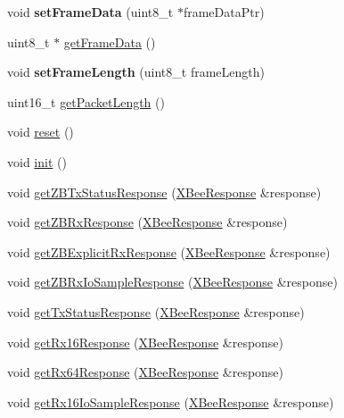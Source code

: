 \begin{DoxyCompactItemize}
\item 
\hypertarget{class_x_bee_response_a13788c12c5201769a304880335749b69}{}\label{class_x_bee_response_a13788c12c5201769a304880335749b69} 
void {\bfseries set\+Frame\+Data} (uint8\+\_\+t $\ast$frame\+Data\+Ptr)
\item 
uint8\+\_\+t $\ast$ \hyperlink{class_x_bee_response_ad958f0b5200138545bdd762111299a94}{get\+Frame\+Data} ()
\item 
\hypertarget{class_x_bee_response_ad2419bab7589e82b5358482c1abbe87c}{}\label{class_x_bee_response_ad2419bab7589e82b5358482c1abbe87c} 
void {\bfseries set\+Frame\+Length} (uint8\+\_\+t frame\+Length)
\item 
uint16\+\_\+t \hyperlink{class_x_bee_response_a26a7c8baad9cc0322a38db997685d889}{get\+Packet\+Length} ()
\item 
void \hyperlink{class_x_bee_response_aa08a73f576fc7ce2f7fa154342c01fba}{reset} ()
\item 
void \hyperlink{class_x_bee_response_af084604e35462783ecd293ffc090d6dc}{init} ()
\item 
void \hyperlink{class_x_bee_response_a1353f14b87b9cbdc1f8001fb8c5e9d35}{get\+Z\+B\+Tx\+Status\+Response} (\hyperlink{class_x_bee_response}{X\+Bee\+Response} \&response)
\item 
void \hyperlink{class_x_bee_response_a4c0edfc6be81349237956531a006d3ab}{get\+Z\+B\+Rx\+Response} (\hyperlink{class_x_bee_response}{X\+Bee\+Response} \&response)
\item 
void \hyperlink{class_x_bee_response_a007fe3ffddf5ee83db25654654e79728}{get\+Z\+B\+Explicit\+Rx\+Response} (\hyperlink{class_x_bee_response}{X\+Bee\+Response} \&response)
\item 
void \hyperlink{class_x_bee_response_a0c1f8d66b1b276fd6d482c589d5cda3d}{get\+Z\+B\+Rx\+Io\+Sample\+Response} (\hyperlink{class_x_bee_response}{X\+Bee\+Response} \&response)
\item 
void \hyperlink{class_x_bee_response_a2fd9882d767d48e679a7595b780c2a2d}{get\+Tx\+Status\+Response} (\hyperlink{class_x_bee_response}{X\+Bee\+Response} \&response)
\item 
void \hyperlink{class_x_bee_response_ab85f25eac3e57d665e2189d84cb5d2e3}{get\+Rx16\+Response} (\hyperlink{class_x_bee_response}{X\+Bee\+Response} \&response)
\item 
void \hyperlink{class_x_bee_response_a72e5b863c14a9ec0a4f1cdeba5f24e58}{get\+Rx64\+Response} (\hyperlink{class_x_bee_response}{X\+Bee\+Response} \&response)
\item 
void \hyperlink{class_x_bee_response_ae84d38e3759ebf8b23d256b207e5761d}{get\+Rx16\+Io\+Sample\+Response} (\hyperlink{class_x_bee_response}{X\+Bee\+Response} \&response)

\end{DoxyCompactItemize}
